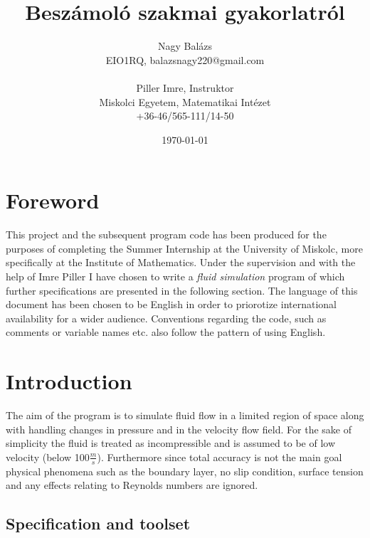 \documentclass[12pt, titlepage]{article}
\begin{document}
\pagestyle{fancy}

\title{Beszámoló szakmai gyakorlatról}
\author{Nagy Balázs \\EIO1RQ, balazsnagy220@gmail.com\\\\Piller Imre, Instruktor\\Miskolci Egyetem, Matematikai Intézet\\+36-46/565-111/14-50}
\date{\today}
\maketitle

\tableofcontents

\pagebreak

\section{Foreword}

This project and the subsequent program code has been produced for the purposes of completing the Summer Internship at the University of Miskolc, more specifically at the Institute of Mathematics. Under the supervision and with the help of Imre Piller I have chosen to write a \textit{fluid simulation} program of which further specifications are presented in the following section. The language of this document has been chosen to be English in order to priorotize international availability for a wider audience. Conventions regarding the code, such as comments or variable names etc. also follow the pattern of using English.

\section{Introduction}

The aim of the program is to simulate fluid flow in a limited region of space along with handling changes in pressure and in the velocity flow field. For the sake of simplicity the fluid is treated as incompressible and is assumed to be of low velocity (below 100$\frac{m}{s}$). Furthermore since total accuracy is not the main goal physical phenomena such as the boundary layer, no slip condition, surface tension and any effects relating to Reynolds numbers are ignored.

\subsection{Specification and toolset}
\end{document}
